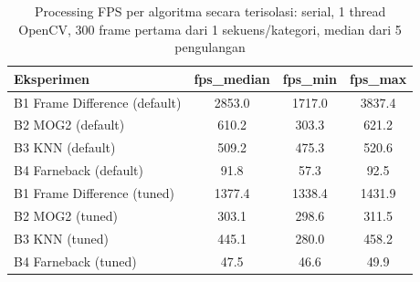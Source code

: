 \begin{table}[t]
\centering
\caption{Processing FPS per algoritma secara terisolasi: serial, 1 thread OpenCV, 300 frame pertama dari 1 sekuens/kategori, median dari 5 pengulangan}
\label{tab:table_fps}
\begin{tabular}{lccc}
\toprule
Eksperimen & fps\_median & fps\_min & fps\_max \\
\midrule
B1 Frame Difference (default) & 2853.0 & 1717.0 & 3837.4 \\
B2 MOG2 (default) & 610.2 & 303.3 & 621.2 \\
B3 KNN (default) & 509.2 & 475.3 & 520.6 \\
B4 Farneback (default) & 91.8 & 57.3 & 92.5 \\
B1 Frame Difference (tuned) & 1377.4 & 1338.4 & 1431.9 \\
B2 MOG2 (tuned) & 303.1 & 298.6 & 311.5 \\
B3 KNN (tuned) & 445.1 & 280.0 & 458.2 \\
B4 Farneback (tuned) & 47.5 & 46.6 & 49.9 \\
\bottomrule
\end{tabular}
\end{table}

